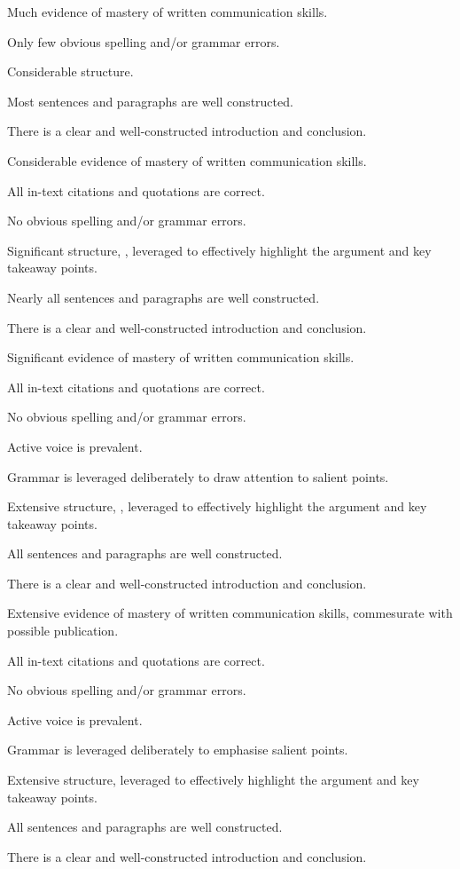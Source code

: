 \documentclass{../../fal_assignment}
\begin{document}
\begin{markingrubric}
        \grade 		Much evidence of mastery of written communication skills.

        \par 		Only few obvious spelling and/or grammar errors.
        \par 		Considerable structure.   
        \par 		Most sentences and paragraphs are well constructed.
        \par 		There is a clear and well-constructed introduction and conclusion.
        
        \grade 		Considerable evidence of mastery of written communication skills.
        \par 		All in-text citations and quotations are correct.
        \par 		No obvious spelling and/or grammar errors.
        \par 		Significant structure, , leveraged to effectively highlight the argument and key takeaway points.  
        \par 		Nearly all sentences and paragraphs are well constructed.
        \par 		There is a clear and well-constructed introduction and conclusion.
        
        \grade 		Significant evidence of mastery of written communication skills.
        \par 		All in-text citations and quotations are correct.
        \par 		No obvious spelling and/or grammar errors.
       \par 		Active voice is prevalent.
        \par 		Grammar is leveraged deliberately to draw attention to salient points.     
        \par 		Extensive structure, , leveraged to effectively highlight the argument and key takeaway points. 
        \par 		All sentences and paragraphs are well constructed.
        \par 		There is a clear and well-constructed introduction and conclusion.
        
        \grade 		Extensive evidence of mastery of written communication skills, commesurate with possible publication.
        \par 		All in-text citations and quotations are correct.
        \par 		No obvious spelling and/or grammar errors.
        \par 		Active voice is prevalent.
        \par 		Grammar is leveraged deliberately to emphasise salient points.     
        \par 		Extensive structure, leveraged to effectively highlight the argument and key takeaway points.
        \par 		All sentences and paragraphs are well constructed.
        \par 		There is a clear and well-constructed introduction and conclusion.
\end{markingrubric}
\end{document}
